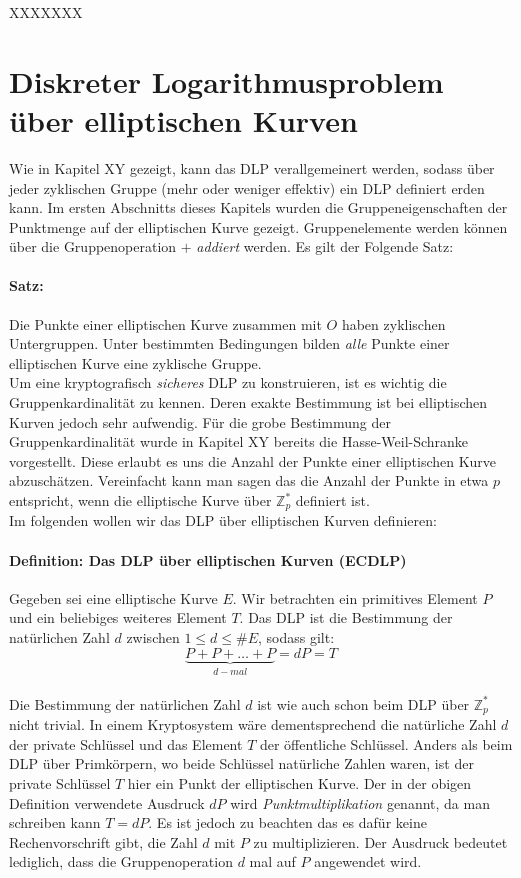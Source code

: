 XXXXXXX

\section{Diskreter Logarithmusproblem über elliptischen Kurven} \label{sec:DLPüberEC}
Wie in Kapitel XY gezeigt, kann das DLP verallgemeinert werden, sodass über jeder zyklischen Gruppe (mehr oder weniger effektiv) ein DLP definiert erden kann. Im ersten Abschnitts dieses Kapitels wurden die Gruppeneigenschaften der Punktmenge auf der elliptischen Kurve gezeigt. Gruppenelemente werden können über die Gruppenoperation $+$ \textit{addiert} werden. Es gilt der Folgende Satz:

\paragraph{Satz:}
Die Punkte einer elliptischen Kurve zusammen mit $O$ haben zyklischen Untergruppen. Unter bestimmten Bedingungen bilden \textit{alle} Punkte einer elliptischen Kurve eine zyklische Gruppe.\\

Um eine kryptografisch \textit{sicheres} DLP zu konstruieren, ist es wichtig die Gruppenkardinalität zu kennen. Deren exakte Bestimmung ist bei elliptischen Kurven jedoch sehr aufwendig. Für die grobe Bestimmung der Gruppenkardinalität wurde in Kapitel XY bereits die Hasse-Weil-Schranke vorgestellt. Diese erlaubt es uns die Anzahl der Punkte einer elliptischen Kurve abzuschätzen. Vereinfacht kann man sagen das die Anzahl der Punkte in etwa $p$ entspricht, wenn die elliptische Kurve über $\mathbb{Z}^*_p$ definiert ist.\\

Im folgenden wollen wir das DLP über elliptischen Kurven definieren:

\paragraph{Definition: Das DLP über elliptischen Kurven (ECDLP)}
Gegeben sei eine elliptische Kurve $E$. Wir betrachten ein primitives Element $P$ und ein beliebiges weiteres Element $T$. Das DLP ist die Bestimmung der natürlichen Zahl $d$ zwischen $1 \leq d \leq \#E$, sodass gilt:
$$\underbrace{P + P + \dots + P}_{d-mal} = d P = T$$\\

Die Bestimmung der natürlichen Zahl $d$ ist wie auch schon beim DLP über $\mathbb{Z}^*_p$ nicht trivial. In einem Kryptosystem wäre dementsprechend die natürliche Zahl $d$ der private Schlüssel und das Element $T$ der öffentliche Schlüssel. Anders als beim DLP über Primkörpern, wo beide Schlüssel natürliche Zahlen waren, ist der private Schlüssel $T$ hier ein Punkt der elliptischen Kurve. Der in der obigen Definition verwendete Ausdruck $dP$ wird \textit{Punktmultiplikation} genannt, da man schreiben kann $T = dP$. Es ist jedoch zu beachten das es dafür keine Rechenvorschrift gibt, die Zahl $d$ mit $P$ zu multiplizieren. Der Ausdruck bedeutet lediglich, dass die Gruppenoperation $d$ mal auf $P$ angewendet wird.\\

